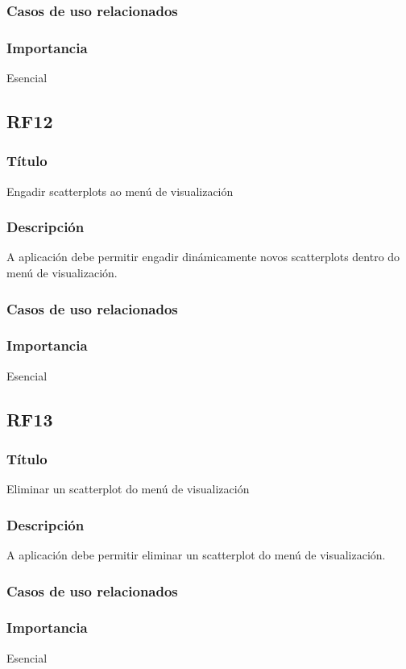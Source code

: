 \subsubsection{Casos de uso relacionados}
\subsubsection{Importancia}
Esencial

\subsection*{RF12}
\subsubsection{Título}
Engadir scatterplots ao menú de visualización
\subsubsection{Descripción}
A aplicación debe permitir engadir dinámicamente novos scatterplots dentro do menú de visualización.
\subsubsection{Casos de uso relacionados}
\subsubsection{Importancia}
Esencial

\subsection*{RF13}
\subsubsection{Título}
Eliminar un scatterplot do menú de visualización
\subsubsection{Descripción}
A aplicación debe permitir eliminar un scatterplot do menú de visualización.
\subsubsection{Casos de uso relacionados}
\subsubsection{Importancia}
Esencial


